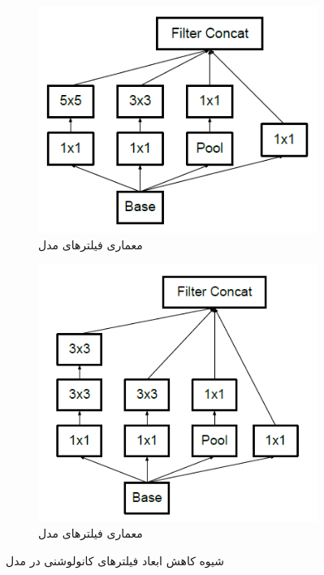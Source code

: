 \documentclass[12pt, a4paper]{article}
\begin{document}
\begin{itemize}
    \begin{figure}[h]
        \begin{subfigure}{0.45\linewidth}
            \centering
            \includegraphics[width=0.8\linewidth]{images/inception/inceptionv1_conv.png}
            \caption{معماری فیلتر‌های مدل }
            \label{improved_conv_inceptionv1}
        \end{subfigure}
        \hfill
        \begin{subfigure}{0.45\linewidth}
            \centering
            \includegraphics[width=0.8\linewidth]{images/inception/inceptionv3_conv.png}
            \caption{معماری فیلتر‌های مدل }
            \label{improved_conv_inceptionv3}
        \end{subfigure}
        \caption{شیوه کاهش ابعاد فیلتر‌های کانولوشنی در مدل }
        \label{improved_conv}
    \end{figure}


\end{itemize}
\end{document}

